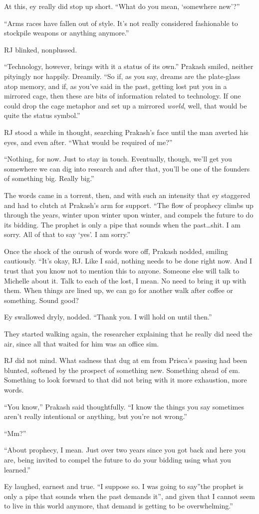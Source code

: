 At this, ey really did stop up short. ``What do you mean, `somewhere new'?''

``Arms races have fallen out of style. It's not really considered fashionable to stockpile weapons or anything anymore.''

RJ blinked, nonplussed.

``Technology, however, brings with it a status of its own.'' Prakash smiled, neither pityingly nor happily. Dreamily. ``So if, as you say, dreams are the plate-glass atop memory, and if, as you've said in the past, getting lost put you in a mirrored cage, then these are bits of information related to technology. If one could drop the cage metaphor and set up a mirrored \emph{world}, well, that would be quite the status symbol.''

RJ stood a while in thought, searching Prakash's face until the man averted his eyes, and even after. ``What would be required of me?''

``Nothing, for now. Just to stay in touch. Eventually, though, we'll get you somewhere we can dig into research and after that, you'll be one of the founders of something big. Really big.''

The words came in a torrent, then, and with such an intensity that ey staggered and had to clutch at Prakash's arm for support. ``The flow of prophecy climbs up through the years, winter upon winter upon winter, and compels the future to do its bidding. The prophet is only a pipe that sounds when the past\ldots shit. I am sorry. All of that to say `yes'. I am sorry.''

Once the shock of the onrush of words wore off, Prakash nodded, smiling cautiously. ``It's okay, RJ. Like I said, nothing needs to be done right now. And I trust that you know not to mention this to anyone. Someone else will talk to Michelle about it. Talk to each of the lost, I mean. No need to bring it up with them. When things are lined up, we can go for another walk after coffee or something. Sound good?

Ey swallowed dryly, nodded. ``Thank you. I will hold on until then.''

They started walking again, the researcher explaining that he really did need the air, since all that waited for him was an office sim.

RJ did not mind. What sadness that dug at em from Prisca's passing had been blunted, softened by the prospect of something new. Something ahead of em. Something to look forward to that did not bring with it more exhaustion, more words.

``You know,'' Prakash said thoughtfully. ``I know the things you say sometimes aren't really intentional or anything, but you're not wrong.''

``Mm?''

``About prophecy, I mean. Just over two years since you got back and here you are, being invited to compel the future to do your bidding using what you learned.''

Ey laughed, earnest and true. ``I suppose so. I was going to say''the prophet is only a pipe that sounds when the past demands it'', and given that I cannot seem to live in this world anymore, that demand is getting to be overwhelming.''

